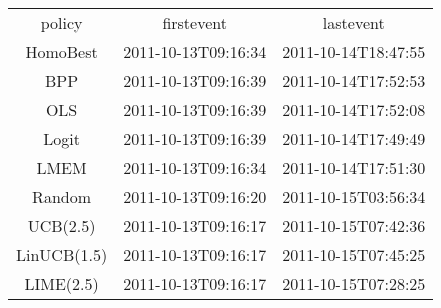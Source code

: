\begin{tabular}{ccc}
policy & firstevent & lastevent\\
HomoBest & 2011-10-13T09:16:34 & 2011-10-14T18:47:55\\
BPP & 2011-10-13T09:16:39 & 2011-10-14T17:52:53\\
OLS & 2011-10-13T09:16:39 & 2011-10-14T17:52:08\\
Logit & 2011-10-13T09:16:39 & 2011-10-14T17:49:49\\
LMEM & 2011-10-13T09:16:34 & 2011-10-14T17:51:30\\
Random & 2011-10-13T09:16:20 & 2011-10-15T03:56:34\\
UCB(2.5) & 2011-10-13T09:16:17 & 2011-10-15T07:42:36\\
LinUCB(1.5) & 2011-10-13T09:16:17 & 2011-10-15T07:45:25\\
LIME(2.5) & 2011-10-13T09:16:17 & 2011-10-15T07:28:25\\
\end{tabular}

